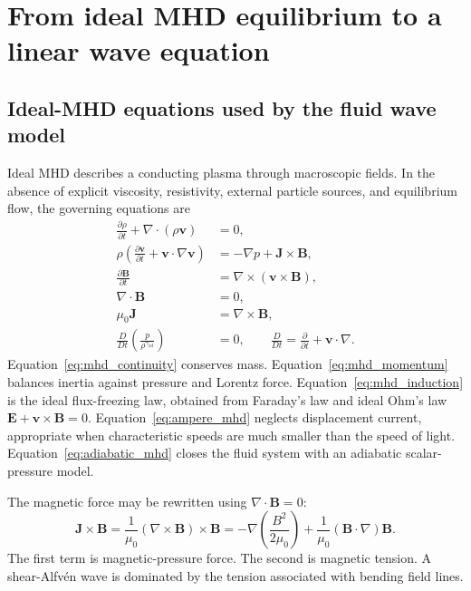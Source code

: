 \section{From ideal MHD equilibrium to a linear wave equation}
\label{sec:linear_mhd}

\subsection{Ideal-MHD equations used by the fluid wave model}
Ideal MHD describes a conducting plasma through macroscopic fields. In the absence of explicit viscosity, resistivity, external particle sources, and equilibrium flow, the governing equations are
\begin{align}
\frac{\partial\rho}{\partial t}+\nabla\cdot(\rho\mathbf v)&=0,
\label{eq:mhd_continuity}\\
\rho\left(\frac{\partial\mathbf v}{\partial t}+\mathbf v\cdot\nabla\mathbf v\right)
&=-\nabla p+\mathbf J\times\mathbf B,
\label{eq:mhd_momentum}\\
\frac{\partial\mathbf B}{\partial t}&=\nabla\times(\mathbf v\times\mathbf B),
\label{eq:mhd_induction}\\
\nabla\cdot\mathbf B&=0,
\label{eq:divb}\\
\mu_0\mathbf J&=\nabla\times\mathbf B,
\label{eq:ampere_mhd}\\
\frac{D}{Dt}\left(\frac{p}{\rho^{\gamma_{\mathrm{ad}}}}\right)&=0,
\qquad
\frac{D}{Dt}=\frac{\partial}{\partial t}+\mathbf v\cdot\nabla.
\label{eq:adiabatic_mhd}
\end{align}
Equation~\eqref{eq:mhd_continuity} conserves mass. Equation~\eqref{eq:mhd_momentum} balances inertia against pressure and Lorentz force. Equation~\eqref{eq:mhd_induction} is the ideal flux-freezing law, obtained from Faraday's law and ideal Ohm's law $\mathbf E+\mathbf v\times\mathbf B=0$. Equation~\eqref{eq:ampere_mhd} neglects displacement current, appropriate when characteristic speeds are much smaller than the speed of light. Equation~\eqref{eq:adiabatic_mhd} closes the fluid system with an adiabatic scalar-pressure model.

The magnetic force may be rewritten using $\nabla\cdot\mathbf B=0$:
\begin{equation}
\mathbf J\times\mathbf B
=\frac{1}{\mu_0}(\nabla\times\mathbf B)\times\mathbf B
=-\nabla\left(\frac{B^2}{2\mu_0}\right)
+\frac{1}{\mu_0}(\mathbf B\cdot\nabla)\mathbf B.
\label{eq:magnetic_pressure_tension}
\end{equation}
The first term is magnetic-pressure force. The second is magnetic tension. A shear-Alfv\'en wave is dominated by the tension associated with bending field lines.

